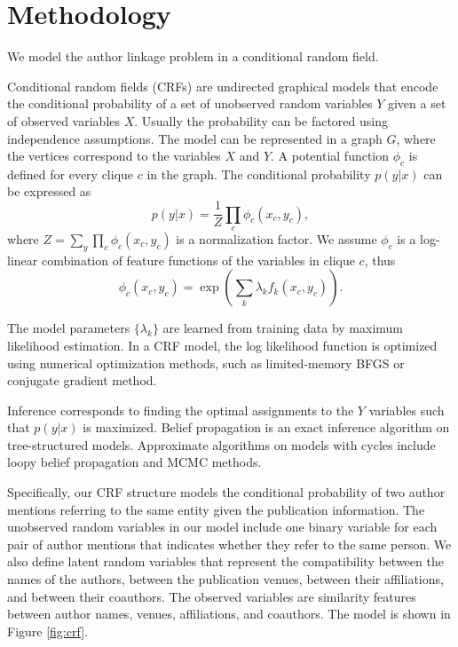\documentclass[twocolumn,letterpaper]{article}
\begin{document}

\section{Methodology} %
\label{sec:methodology}
We model the author linkage problem in a conditional random field.

Conditional random fields (CRFs) are undirected graphical models that encode the conditional probability of a set of unobserved random variables $Y$ given a set of observed variables $X$.  Usually the probability can be factored using independence assumptions.  The model can be represented in a graph $G$, where the vertices correspond to the variables $X$ and $Y$.  A potential function $\phi_c$ is defined for every clique $c$ in the graph.  The conditional probability $p(y|x)$ can be expressed as
$$p(y|x)=\frac{1}{Z}\prod_c \phi_c(x_c,y_c),$$
where $Z=\sum_y\prod_c \phi_c(x_c,y_c)$ is a normalization factor.  We assume $\phi_c$ is a log-linear combination of feature functions of the variables in clique $c$, thus
$$\phi_c(x_c,y_c)=\exp\left(\sum_k \lambda_k f_k(x_c,y_c)\right).$$

The model parameters $\{\lambda_k\}$ are learned from training data by
maximum likelihood estimation.  In a CRF model, the log likelihood
function is optimized using numerical optimization methods, such as
limited-memory BFGS or conjugate gradient method.

Inference corresponds to finding the optimal assignments to the $Y$
variables such that $p(y|x)$ is maximized.  Belief propagation is an
exact inference algorithm on tree-structured models.  Approximate
algorithms on models with cycles include loopy belief propagation and
MCMC methods.



Specifically, our CRF structure models the conditional probability of
two author mentions referring to the same entity given the publication
information.  The unobserved random variables in our model include one
binary variable for each pair of author mentions that indicates
whether they refer to the same person.  We also define latent random
variables that represent the compatibility between the names of the
authors, between the publication venues, between their affiliations,
and between their coauthors.  The observed variables are similarity
features between author names, venues, affiliations, and coauthors.
The model is shown in Figure \ref{fig:crf}.
\end{document}
